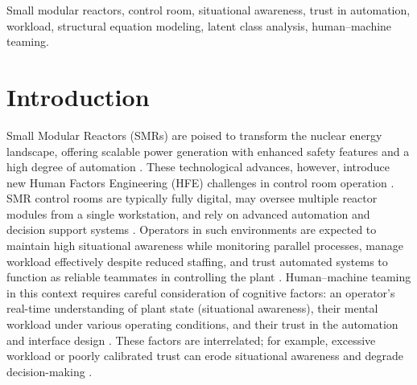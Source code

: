 \documentclass[conference]{IEEEtran}
\begin{document}
\begin{IEEEkeywords}
Small modular reactors, control room, situational awareness, trust in automation, workload, structural equation modeling, latent class analysis, human–machine teaming.
\end{IEEEkeywords}

\section{Introduction}

Small Modular Reactors (SMRs) are poised to transform the nuclear energy landscape, offering scalable power generation with enhanced safety features and a high degree of automation \cite{iaea2020advances, inl2020smr, nrc2016human, oecd2016technical}. These technological advances, however, introduce new Human Factors Engineering (HFE) challenges in control room operation \cite{nrc2016human, nuclear2024analysis, oecd2016technical, iapsam2022human}. SMR control rooms are typically fully digital, may oversee multiple reactor modules from a single workstation, and rely on advanced automation and decision support systems \cite{oecd2016technical, iapsam2022human, taylor2025small, pmc2021effects}. Operators in such environments are expected to maintain high situational awareness while monitoring parallel processes, manage workload effectively despite reduced staffing, and trust automated systems to function as reliable teammates in controlling the plant \cite{taylor2025small, pmc2021effects, sciencedirect2015measuring, pubmed2024human}. Human–machine teaming in this context requires careful consideration of cognitive factors: an operator’s real-time understanding of plant state (situational awareness), their mental workload under various operating conditions, and their trust in the automation and interface design \cite{sciencedirect2015measuring, pubmed2024human, sage1995toward, sciencedirect2015situation}. These factors are interrelated; for example, excessive workload or poorly calibrated trust can erode situational awareness and degrade decision-making \cite{sage1995toward, sciencedirect2015situation, sage2004trust, taylor2025small}.
\end{document}
